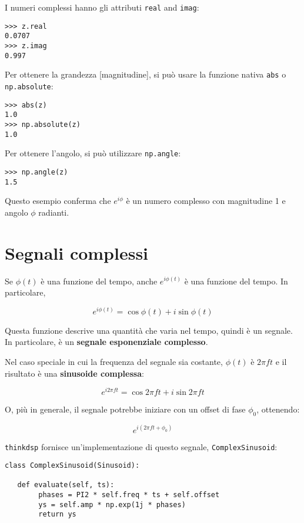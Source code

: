 \documentclass[12pt,a4paper]{book}
\begin{document}
I numeri complessi hanno gli attributi {\tt real} and {\tt imag}:

\begin{verbatim} 
>>> z.real
0.0707
>>> z.imag
0.997
 \end{verbatim} 

Per ottenere la grandezza [magnitudine], si può usare la funzione nativa {\tt abs} o {\tt np.absolute}:

\begin{verbatim} 
>>> abs(z)
1.0
>>> np.absolute(z)
1.0
 \end{verbatim} 

Per ottenere l'angolo, si può utilizzare {\tt np.angle}:

\begin{verbatim} 
>>> np.angle(z)
1.5
 \end{verbatim} 

Questo esempio conferma che $e^{i \phi}$ è un numero complesso con magnitudine 1 e angolo $\phi$ radianti.

\section{Segnali complessi} 

Se $\phi(t)$ è una funzione del tempo, anche $e^{i \phi(t)}$ è una funzione del tempo. In particolare,

%
\[ e^{i \phi(t)} = \cos \phi(t) + i \sin \phi(t) \] 

%
Questa funzione descrive una quantità che varia nel tempo, quindi è un segnale. In particolare, è un {\bf segnale esponenziale complesso}.

Nel caso speciale in cui la frequenza del segnale sia costante, $\phi(t)$ è $2 \pi f t$ e il risultato è una {\bf sinusoide complessa}:

%
\[ e^{i 2 \pi f t} = \cos 2 \pi f t + i \sin 2 \pi f t \] 

%
O, più in generale, il segnale potrebbe iniziare con un offset di fase $\phi_0$, ottenendo:

%
\[ e^{i (2 \pi f t + \phi_0)} \] 

%
{\tt thinkdsp} fornisce un'implementazione di questo segnale, {\tt ComplexSinusoid}:

\begin{verbatim} 
class ComplexSinusoid(Sinusoid):

   def evaluate(self, ts):
        phases = PI2 * self.freq * ts + self.offset
        ys = self.amp * np.exp(1j * phases)
        return ys
 \end{verbatim} 
\end{document}
